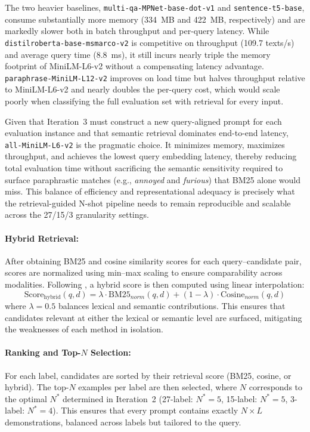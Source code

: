 The two heavier baselines, \texttt{multi-qa-MPNet-base-dot-v1} and \texttt{sentence-t5-base}, consume substantially more memory (334~MB and 422~MB, respectively) and are markedly slower both in batch throughput and per-query latency. While \texttt{distilroberta-base-msmarco-v2} is competitive on throughput (109.7 texts/s) and average query time (8.8~ms), it still incurs nearly triple the memory footprint of MiniLM-L6-v2 without a compensating latency advantage. \texttt{paraphrase-MiniLM-L12-v2} improves on load time but halves throughput relative to MiniLM-L6-v2 and nearly doubles the per-query cost, which would scale poorly when classifying the full evaluation set with retrieval for every input.

Given that Iteration~3 must construct a new query-aligned prompt for each evaluation instance and that semantic retrieval dominates end-to-end latency, \texttt{all-MiniLM-L6-v2} is the pragmatic choice. It minimizes memory, maximizes throughput, and achieves the lowest query embedding latency, thereby reducing total evaluation time without sacrificing the semantic sensitivity required to surface paraphrastic matches (e.g., \emph{annoyed} and \emph{furious}) that BM25 alone would miss. This balance of efficiency and representational adequacy is precisely what the retrieval-guided N-shot pipeline needs to remain reproducible and scalable across the 27/15/3 granularity settings.

\paragraph{Hybrid Retrieval:}  
After obtaining BM25 and cosine similarity scores for each query--candidate pair, scores are normalized using min--max scaling to ensure comparability across modalities. 
Following \cite{hyst2025}, a hybrid score is then computed using linear interpolation:  
\[
\text{Score}_{\text{hybrid}}(q, d) = \lambda \cdot \text{BM25}_{norm}(q, d) + (1 - \lambda) \cdot \text{Cosine}_{norm}(q, d)
\]
where $\lambda=0.5$ balances lexical and semantic contributions. 
This ensures that candidates relevant at either the lexical or semantic level are surfaced, mitigating the weaknesses of each method in isolation.  

\paragraph{Ranking and Top-$N$ Selection:}  
For each label, candidates are sorted by their retrieval score (BM25, cosine, or hybrid). 
The top-$N$ examples per label are then selected, where $N$ corresponds to the optimal $N^\ast$ determined in Iteration~2 (27-label: $N^\ast=5$, 15-label: $N^\ast=5$, 3-label: $N^\ast=4$). 
This ensures that every prompt contains exactly $N \times L$ demonstrations, balanced across labels but tailored to the query.  

